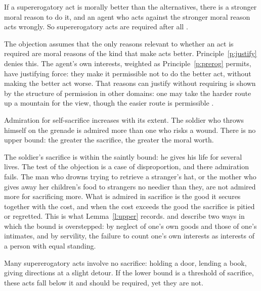 \documentclass{situationist-preprint}
\begin{document}
\begin{objection}\label{o:paradox}
If a supererogatory act is morally better than the alternatives, there is a stronger moral reason to do it, and an agent who acts against the stronger moral reason acts wrongly. So supererogatory acts are required after all \citep{Kagan1989}.
\end{objection}

\begin{reply}
The objection assumes that the only reasons relevant to whether an act is required are moral reasons of the kind that make acts better. Principle~\ref{p:justify} denies this. The agent's own interests, weighted as Principle~\ref{p:prerog} permits, have justifying force: they make it permissible not to do the better act, without making the better act worse. That reasons can justify without requiring is shown by the structure of permission in other domains: one may take the harder route up a mountain for the view, though the easier route is permissible \citep{Gert2003,Portmore2011}.
\end{reply}

\begin{objection}\label{o:more}
Admiration for self-sacrifice increases with its extent. The soldier who throws himself on the grenade is admired more than one who risks a wound. There is no upper bound: the greater the sacrifice, the greater the moral worth.
\end{objection}

\begin{reply}
The soldier's sacrifice is within the saintly bound: he gives his life for several lives. The test of the objection is a case of disproportion, and there admiration fails. The man who drowns trying to retrieve a stranger's hat, or the mother who gives away her children's food to strangers no needier than they, are not admired more for sacrificing more. What is admired in sacrifice is the good it secures together with the cost, and when the cost exceeds the good the sacrifice is pitied or regretted. This is what Lemma~\ref{l:upper} records. \citet{Wolf1982} and \citet{Hill1973} describe two ways in which the bound is overstepped: by neglect of one's own goods and those of one's intimates, and by servility, the failure to count one's own interests as interests of a person with equal standing.
\end{reply}

\begin{objection}\label{o:favours}
Many supererogatory acts involve no sacrifice: holding a door, lending a book, giving directions at a slight detour. If the lower bound is a threshold of sacrifice, these acts fall below it and should be required, yet they are not.
\end{objection}
\end{document}

